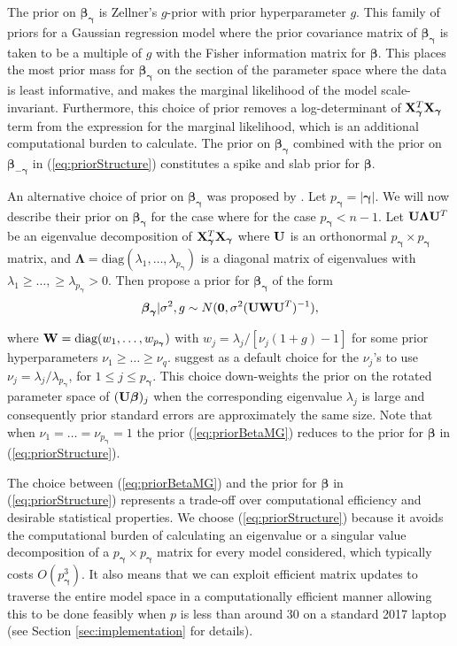 \documentclass[12pt]{article}
\def\vectorfontone{\bf}
\def\vectorfonttwo{\boldsymbol}
\def\vzero{{\vectorfontone 0}}
\def\vbeta{{\vectorfonttwo \beta}}               %
\def\vgamma{{\vectorfonttwo \gamma}}             %
\def\vnu{{\vectorfonttwo \nu}}                   %
\def\matrixfontone{\bf}
\def\matrixfonttwo{\boldsymbol}
\def\mU{{\matrixfontone U}}                      %
\def\mW{{\matrixfontone W}}                      %
\def\mX{{\matrixfontone X}}                      %
\def\mLambda{{\matrixfonttwo \Lambda}}           %
\begin{document}
The prior on $\vbeta_\vgamma$ is Zellner's $g$-prior \citep[see for example,][]{Zellner1986} with prior 
hyperparameter $g$. This family of priors for a Gaussian regression model where the prior covariance 
matrix of $\vbeta_\vgamma$ is taken to be a multiple of $g$ with the Fisher information matrix for $\vbeta$. 
This places the most prior mass for $\vbeta_\vgamma$ on the section of the parameter space where the data is 
least informative, and makes the marginal likelihood of the model scale-invariant. Furthermore, this 
choice of prior removes a log-determinant of $\mX_\vgamma^T\mX_\vgamma$ term from the expression for the marginal 
likelihood, which is an additional computational burden to calculate.
The prior on $\vbeta_\vgamma$ combined with the prior on $\vbeta_{-\vgamma}$
in (\ref{eq:priorStructure}) constitutes  a spike and slab prior for $\vbeta$.
 
An alternative choice of prior on $\vbeta_\vgamma$ was proposed by \cite{Maruyama2011}. Let
$p_{\vgamma} = |\vgamma|$. We will now describe their prior on $\vbeta_\vgamma$ for the case where for the case
$p_{\vgamma} < n - 1$. Let $\mU\mLambda\mU^T$ be an eigenvalue decomposition of $\mX_\vgamma^T\mX_\vgamma$
where $\mU$ is an orthonormal $p_{\vgamma} \times p_{\vgamma}$ matrix, and $\mLambda = \mbox{diag}(\lambda_1,\ldots,\lambda_{p_{\vgamma}})$ 
is a diagonal matrix of eigenvalues with $\lambda_1\ge\ldots,\ge \lambda_{p_{\vgamma}}>0$. Then \cite{Maruyama2011} 
propose a prior for $\vbeta_\vgamma$ of the form
\begin{equation}
\label{eq:priorBetaMG}
\vbeta_\vgamma | \sigma^2, g \sim N(\vzero, \sigma^2 (\mU\mW\mU^T)^{-1}),   
\end{equation} 

\noindent where $\mW = \mbox{diag}(w_1,\ldots,w_{p_{\vgamma}})$ with $ w_j = \lambda_j/[\nu_j(1 + g) - 1]$ for 
some prior hyperparameters $\nu_1 \ge \ldots \ge \nu_q$. \cite{Maruyama2011} suggest as a default 
choice for the $\nu_j$'s to use $\nu_j = \lambda_j/\lambda_{p_{\vgamma}}$, for $1\le j \le p_{\vgamma}$. 
This choice down-weights the prior on the rotated parameter space of $(\mU \vbeta)_j$ when the 
corresponding eigenvalue $\lambda_j$ is large and consequently prior standard errors are 
approximately the same size. Note that when $\nu_1 = \ldots = \nu_{p_{\vgamma}} = 1$ the prior 
(\ref{eq:priorBetaMG}) reduces to the prior for $\vbeta$ in (\ref{eq:priorStructure}). 

The choice between (\ref{eq:priorBetaMG}) and the prior for $\vbeta$ in (\ref{eq:priorStructure}) 
represents a trade-off over computational efficiency and desirable statistical properties. We choose
(\ref{eq:priorStructure}) because it avoids the computational burden of calculating an eigenvalue or a singular 
value decomposition of a $p_{\vgamma}\times p_{\vgamma}$ matrix for every model considered,
which typically costs $O(p_{\vgamma}^3)$. 
It also means that we can 
exploit efficient matrix updates to traverse the entire model space in a computationally efficient 
manner allowing this to be done feasibly when $p$ is less than around 30 on a standard 2017 laptop 
(see Section \ref{sec:implementation} for details).
\end{document}
